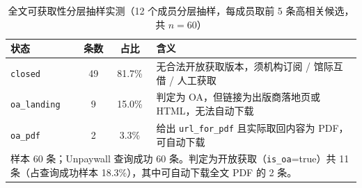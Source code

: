 \begin{table}[htbp]
\centering
\caption{全文可获取性分层抽样实测（12 个成员分层抽样，每成员取前 5 条高相关候选，共 $n=60$）}
\label{tab:oa}
\begin{tabularx}{\textwidth}{l c c X}
\toprule
状态 & 条数 & 占比 & 含义\\
\midrule
\texttt{closed} & 49 & 81.7\% & 无合法开放获取版本，须机构订阅 / 馆际互借 / 人工获取 \\
\texttt{oa\_landing} & 9 & 15.0\% & 判定为 OA，但链接为出版商落地页或 HTML，无法自动下载 \\
\texttt{oa\_pdf} & 2 & 3.3\% & 给出 \texttt{url\_for\_pdf} 且实际取回内容为 PDF，可自动下载 \\
\midrule
\multicolumn{4}{p{0.94\textwidth}}{\footnotesize 样本 60 条；Unpaywall 查询成功 60 条。判定为开放获取（\texttt{is\_oa}=true）共 11 条（占查询成功样本 18.3\%），其中可自动下载全文 PDF 的 2 条。}\\
\bottomrule
\end{tabularx}
\end{table}
